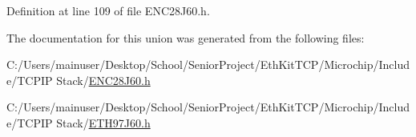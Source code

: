 Definition at line 109 of file E\+N\+C28\+J60.\+h.



The documentation for this union was generated from the following files\+:\begin{DoxyCompactItemize}
\item 
C\+:/\+Users/mainuser/\+Desktop/\+School/\+Senior\+Project/\+Eth\+Kit\+T\+C\+P/\+Microchip/\+Include/\+T\+C\+P\+I\+P Stack/\hyperlink{_e_n_c28_j60_8h}{E\+N\+C28\+J60.\+h}\item 
C\+:/\+Users/mainuser/\+Desktop/\+School/\+Senior\+Project/\+Eth\+Kit\+T\+C\+P/\+Microchip/\+Include/\+T\+C\+P\+I\+P Stack/\hyperlink{_e_t_h97_j60_8h}{E\+T\+H97\+J60.\+h}\end{DoxyCompactItemize}
